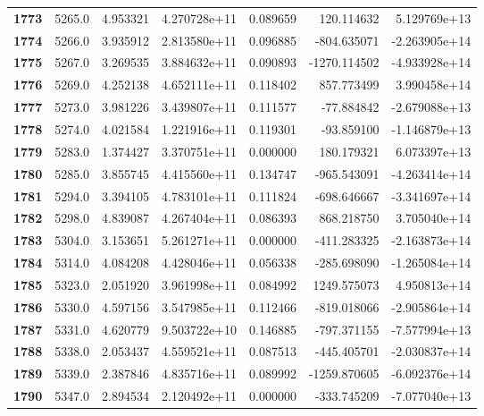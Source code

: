\documentclass{report}[12pt]
\begin{document}
\begin{center}
\begin{tabular}{lrrrrrr}
\textbf{1773} &         5265.0 &   4.953321 &  4.270728e+11 &    0.089659 &   120.114632 &  5.129769e+13 \\
\textbf{1774} &         5266.0 &   3.935912 &  2.813580e+11 &    0.096885 &  -804.635071 & -2.263905e+14 \\
\textbf{1775} &         5267.0 &   3.269535 &  3.884632e+11 &    0.090893 & -1270.114502 & -4.933928e+14 \\
\textbf{1776} &         5269.0 &   4.252138 &  4.652111e+11 &    0.118402 &   857.773499 &  3.990458e+14 \\
\textbf{1777} &         5273.0 &   3.981226 &  3.439807e+11 &    0.111577 &   -77.884842 & -2.679088e+13 \\
\textbf{1778} &         5274.0 &   4.021584 &  1.221916e+11 &    0.119301 &   -93.859100 & -1.146879e+13 \\
\textbf{1779} &         5283.0 &   1.374427 &  3.370751e+11 &    0.000000 &   180.179321 &  6.073397e+13 \\
\textbf{1780} &         5285.0 &   3.855745 &  4.415560e+11 &    0.134747 &  -965.543091 & -4.263414e+14 \\
\textbf{1781} &         5294.0 &   3.394105 &  4.783101e+11 &    0.111824 &  -698.646667 & -3.341697e+14 \\
\textbf{1782} &         5298.0 &   4.839087 &  4.267404e+11 &    0.086393 &   868.218750 &  3.705040e+14 \\
\textbf{1783} &         5304.0 &   3.153651 &  5.261271e+11 &    0.000000 &  -411.283325 & -2.163873e+14 \\
\textbf{1784} &         5314.0 &   4.084208 &  4.428046e+11 &    0.056338 &  -285.698090 & -1.265084e+14 \\
\textbf{1785} &         5323.0 &   2.051920 &  3.961998e+11 &    0.084992 &  1249.575073 &  4.950813e+14 \\
\textbf{1786} &         5330.0 &   4.597156 &  3.547985e+11 &    0.112466 &  -819.018066 & -2.905864e+14 \\
\textbf{1787} &         5331.0 &   4.620779 &  9.503722e+10 &    0.146885 &  -797.371155 & -7.577994e+13 \\
\textbf{1788} &         5338.0 &   2.053437 &  4.559521e+11 &    0.087513 &  -445.405701 & -2.030837e+14 \\
\textbf{1789} &         5339.0 &   2.387846 &  4.835716e+11 &    0.089992 & -1259.870605 & -6.092376e+14 \\
\textbf{1790} &         5347.0 &   2.894534 &  2.120492e+11 &    0.000000 &  -333.745209 & -7.077040e+13 \\

\end{tabular}
\end{center}
\end{document}
